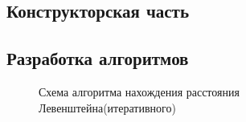 \documentclass[a4paper, 14pt]{article}
\begin{document}
    \begin{center}
    	\newpage
        \section{Конструкторская часть}
        \subsection{Разработка алгоритмов}
        \begin{figure}[h]
			\caption{Схема алгоритма нахождения расстояния Левенштейна(итеративного)}
			\label{ris:image}
		\end{figure}
		\newpage
        \begin{figure}[h]

\end{figure}
\end{center}
\end{document}
